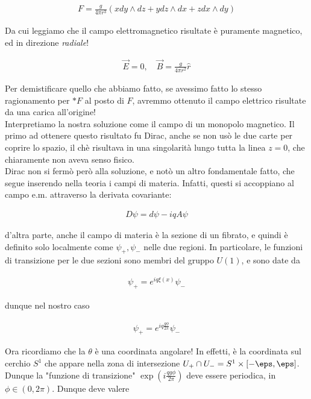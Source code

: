 \documentclass{report}
\begin{document}
\begin{align}
    F = \frac{g}{4\pi r^3}(x dy \wedge dz + y dz \wedge dx + z dx \wedge dy)
\end{align}

Da cui leggiamo che il campo elettromagnetico risultate è puramente magnetico, ed in direzione \emph{radiale}! 

\begin{align}
    \vec{E} = 0, \quad \vec{B} = \frac{g}{4\pi r^2}\hat{r} 
\end{align}

Per demistificare quello che abbiamo fatto, se avessimo fatto lo stesso ragionamento per \(*F\) al posto di \(F\), avremmo ottenuto il campo elettrico risultate da una carica all'origine! \\

Interpretiamo la nostra soluzione come il campo di un monopolo magnetico. Il primo ad ottenere questo risultato fu Dirac, anche se non usò le due carte per coprire lo spazio, il chè risultava in una singolarità lungo tutta la linea \(z=0\), che chiaramente non aveva senso fisico. \\

Dirac non si fermò però alla soluzione, e notò un altro fondamentale fatto, che segue inserendo nella teoria i campi di materia. Infatti, questi si accoppiano al campo e.m. attraverso la derivata covariante: 

\begin{align}
    D\psi = d\psi - iqA\psi 
\end{align}

d'altra parte, anche il campo di materia è la sezione di un fibrato, e quindi è definito solo localmente come \(\psi_+, \psi_-\) nelle due regioni. In particolare, le funzioni di transizione per le due sezioni sono membri del gruppo \(U(1)\), e sono date da 

\begin{align}
    \psi_+ = e^{iq\xi(x)}\psi_-
\end{align}

dunque nel nostro caso 

\begin{align}
    \psi_+ = e^{iq\frac{g\phi}{2\pi}}\psi_-
\end{align}

Ora ricordiamo che la \(\theta\) è una coordinata angolare! In effetti, è la coordinata sul cerchio \(S^1\) che appare nella zona di intersezione \(U_+ \cap U_- = S^1 \times [-\eps, \eps]\). Dunque la "funzione di transizione" \(\exp\left(i\frac{qg \phi}{2\pi}\right)\) deve essere periodica, in \(\phi \in (0, 2\pi)\). Dunque deve valere 
\end{document}
